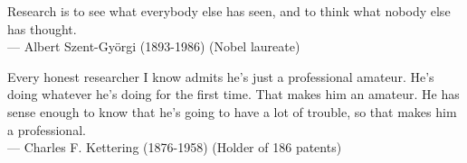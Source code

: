 \thispagestyle{empty}
{}

\vspace*{3cm}

\begin{center}
    Research is to see what everybody else has seen, and to think what nobody else has thought. \\ \medskip
    --- Albert Szent-Györgi (1893-1986) (Nobel laureate)    
\end{center}

\medskip

\begin{center}
Every honest researcher I know admits he's just a professional amateur.
He's doing whatever he's doing for the first time. That makes him an amateur.
He has sense enough to know that he's going to have a lot of trouble,
so that makes him a professional.\\ \medskip
--- Charles F. Kettering (1876-1958) (Holder of 186 patents)
\end{center}